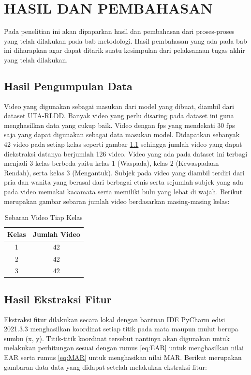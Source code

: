 \chapter{HASIL DAN PEMBAHASAN}
\label{chap:pengujiananalisis}


Pada penelitian ini akan dipaparkan hasil dan pembahasan dari proses-proses yang telah dilakukan pada
bab metodologi. Hasil pembahasan yang ada pada bab ini diharapkan agar dapat ditarik suatu kesimpulan
dari pelaksanaan tugas akhir yang telah dilakukan.

\section{Hasil Pengumpulan Data}
\label{sec:skenariopengujian}

Video yang digunakan sebagai masukan dari model yang dibuat, diambil dari dataset UTA-RLDD. Banyak video yang perlu disaring
pada dataset ini guna menghasilkan data yang cukup baik. Video dengan fps yang mendekati 30 fps saja yang dapat digunakan sebagai
data masukan model. Didapatkan sebanyak 42 video pada setiap kelas seperti gambar \ref{tb:JumlahVideo} sehingga jumlah video
yang dapat diekstraksi datanya berjumlah 126 video. Video yang ada pada dataset ini terbagi menjadi 3 kelas berbeda yaitu
kelas 1 (Waspada), kelas 2 (Kewaspadaan Rendah), serta kelas 3 (Mengantuk). Subjek pada video yang diambil terdiri dari pria
dan wanita yang berasal dari berbagai etnis serta sejumlah subjek yang ada pada video memakai kacamata serta memiliki bulu
yang lebat di wajah. Berikut merupakan gambar sebaran jumlah video berdasarkan masing-masing kelas:

\begin{longtable}{|c|c|}
  \caption{Sebaran Video Tiap Kelas}
  \label{tb:JumlahVideo}                 \\
  \hline
  \rowcolor[HTML]{C0C0C0}
  \textbf{Kelas} & \textbf{Jumlah Video} \\
  \hline
  1              & 42                    \\
  2              & 42                    \\
  3              & 42                    \\
  \hline
\end{longtable}

\section{Hasil Ekstraksi Fitur}
Ekstraksi fitur dilakukan secara lokal dengan bantuan IDE PyCharm edisi 2021.3.3 menghasilkan
koordinat setiap titik pada mata maupun mulut berupa sumbu (x, y). Titik-titik koordinat tersebut nantinya
akan digunakan untuk melakukan perhitungan sesuai dengan rumus \ref{eq:EAR} untuk menghasilkan nilai EAR
serta rumus \ref{eq:MAR} untuk menghasikan nilai MAR. Berikut merupakan gambaran data-data yang didapat
setelah melakukan ekstraksi fitur:


